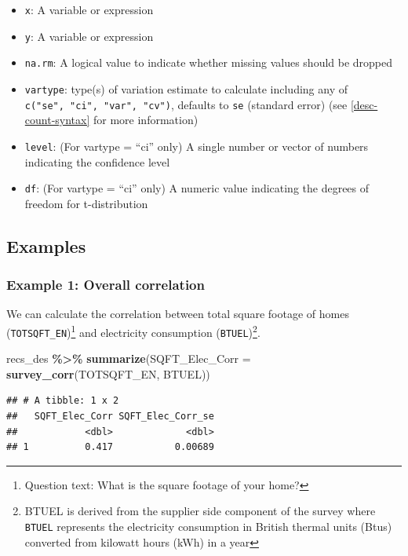 \documentclass[
]{krantz}
\makeatletter
\newenvironment{Shaded}{\begin{snugshade}}{\end{snugshade}}
\newcommand{\AttributeTok}[1]{\textcolor[rgb]{0.27,0.27,0.27}{#1}}
\newcommand{\FunctionTok}[1]{\textcolor[rgb]{0.27,0.27,0.27}{\textbf{#1}}}
\newcommand{\NormalTok}[1]{#1}
\newcommand{\SpecialCharTok}[1]{\textcolor[rgb]{0.43,0.43,0.43}{\textbf{#1}}}
\providecommand{\tightlist}{%
  \setlength{\itemsep}{0pt}\setlength{\parskip}{0pt}}
\newenvironment{kframe}{%
\medskip{}
\setlength{\fboxsep}{.8em}
 \def\at@end@of@kframe{}%
 \ifinner\ifhmode%
  \def\at@end@of@kframe{\end{minipage}}%
  \begin{minipage}{\columnwidth}%
 \fi\fi%
 \def\FrameCommand##1{\hskip\@totalleftmargin \hskip-\fboxsep
 \colorbox{shadecolor}{##1}\hskip-\fboxsep
     \hskip-\linewidth \hskip-\@totalleftmargin \hskip\columnwidth}%
 \MakeFramed {\advance\hsize-\width
   \@totalleftmargin\z@ \linewidth\hsize
   \@setminipage}}%
 {\par\unskip\endMakeFramed%
 \at@end@of@kframe}
\renewenvironment{Shaded}{\begin{kframe}}{\end{kframe}}
\makeatother
\begin{document}
\begin{itemize}
\tightlist
\item
  \texttt{x}: A variable or expression
\item
  \texttt{y}: A variable or expression
\item
  \texttt{na.rm}: A logical value to indicate whether missing values should be dropped
\item
  \texttt{vartype}: type(s) of variation estimate to calculate including any of \texttt{c("se",\ "ci",\ "var",\ "cv")}, defaults to \texttt{se} (standard error) (see \ref{desc-count-syntax} for more information)
\item
  \texttt{level}: (For vartype = ``ci'' only) A single number or vector of numbers indicating the confidence level
\item
  \texttt{df}: (For vartype = ``ci'' only) A numeric value indicating the degrees of freedom for t-distribution
\end{itemize}

\hypertarget{examples-5}{%
\subsection{Examples}\label{examples-5}}

\hypertarget{example-1-overall-correlation}{%
\subsubsection*{Example 1: Overall correlation}\label{example-1-overall-correlation}}


We can calculate the correlation between total square footage of homes (\texttt{TOTSQFT\_EN})\footnote{Question text: What is the square footage of your home?} and electricity consumption (\texttt{BTUEL})\footnote{BTUEL is derived from the supplier side component of the survey where \texttt{BTUEL} represents the electricity consumption in British thermal units (Btus) converted from kilowatt hours (kWh) in a year}.

\begin{Shaded}
\begin{Highlighting}[]
\NormalTok{recs\_des }\SpecialCharTok{\%\textgreater{}\%}
  \FunctionTok{summarize}\NormalTok{(}\AttributeTok{SQFT\_Elec\_Corr =} \FunctionTok{survey\_corr}\NormalTok{(TOTSQFT\_EN, BTUEL))}
\end{Highlighting}
\end{Shaded}

\begin{verbatim}
## # A tibble: 1 x 2
##   SQFT_Elec_Corr SQFT_Elec_Corr_se
##            <dbl>             <dbl>
## 1          0.417           0.00689
\end{verbatim}
\end{document}
